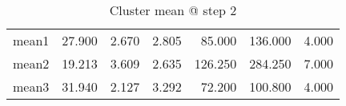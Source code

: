 \begin{table}[htbp]
  \centering
  \caption{Cluster mean @ step 2}
    \begin{tabular}{rrrrrrr}
    \toprule
    mean1 & 27.900  & 2.670  & 2.805  & 85.000  & 136.000  & 4.000  \\
    mean2 & 19.213  & 3.609  & 2.635  & 126.250  & 284.250  & 7.000  \\
    mean3 & 31.940  & 2.127  & 3.292  & 72.200  & 100.800  & 4.000  \\
    \bottomrule
    \end{tabular}%
  \label{tab:mean_b2}%
\end{table}%
